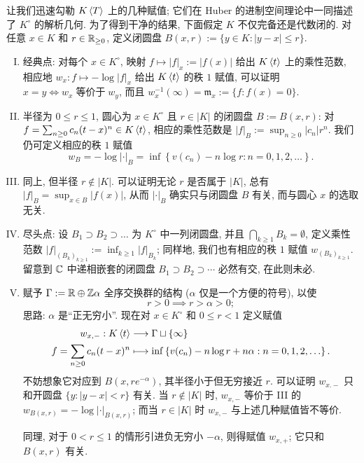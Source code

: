 让我们迅速勾勒 $K\left\langle T \right\rangle$ 上的几种赋值; 它们在 Huber 的进制空间理论中一同描述了 $K^\circ$ 的解析几何. 为了得到干净的结果, 下面假定 $K$ 不仅完备还是代数闭的. 对任意 $x \in K$ 和 $r \in \mathbb{R}_{\geq 0}$, 定义闭圆盘 $B(x,r) := \{ y \in K: |y-x| \leq r \}$.

\begin{enumerate}[I.]
	\item 经典点: 对每个 $x \in K^\circ$, 映射 $f \mapsto |f|_x := |f(x)|$ 给出 $K\left\langle t \right\rangle$ 上的乘性范数, 相应地 $w_x: f \mapsto -\log|f|_x$ 给出 $K\left\langle t \right\rangle$ 的秩 $1$ 赋值, 可以证明 $x=y \iff w_x \;\text{等价于}\; w_y$, 而且 $w_x^{-1}(\infty) = \mathfrak{m}_x := \{f: f(x)=0\}$.
	\item 半径为 $0 \leq r \leq 1$, 圆心为 $x \in K^\circ$ 且 $r \in |K|$ 的闭圆盘 $B := B(x,r)$: 对 $f = \sum_{n \geq 0} c_n (t-x)^n \in K\left\langle t \right\rangle$, 相应的乘性范数是 $|f|_B := \sup_{n \geq 0} |c_n| r^n$. 我们仍可定义相应的秩 $1$ 赋值
		\[ w_B = -\log|\cdot|_B = \inf\left\{ v(c_n) - n \log r : n=0,1,2,\ldots \right\}. \]
	\item 同上, 但半径 $r \notin |K|$. 可以证明无论 $r$ 是否属于 $|K|$, 总有 $|f|_B = \sup_{x \in B} |f(x)|$, 从而 $|\cdot|_B$ 确实只与闭圆盘 $B$ 有关, 而与圆心 $x$ 的选取无关. 
	\item 尽头点: 设 $B_1 \supset B_2 \supset \ldots$ 为 $K^\circ$ 中一列闭圆盘, 并且 $\bigcap_{k \geq 1} B_k = \emptyset$, 定义乘性范数 $|f|_{(B_k)_{k \geq 1}} := \inf_{k \geq 1} |f|_{B_k}$; 同样地, 我们也有相应的秩 $1$ 赋值 $w_{(B_k)_{k \geq 1}}$. 留意到 $\mathbb{C}$ 中递相嵌套的闭圆盘 $B_1 \supset B_2 \supset \cdots$ 必然有交, 在此则未必.
	\item 赋予 $\Gamma := \mathbb{R} \oplus \mathbb{Z}\alpha$ 全序交换群的结构 ($\alpha$ 仅是一个方便的符号), 以使
		\[ r > 0 \implies r > \alpha > 0; \]
		思路: $\alpha$ 是``正无穷小''. 现在对 $x \in K^\circ$ 和 $0 \leq r < 1$ 定义赋值
		\begin{align*}
			w_{x,-}: K\left\langle t \right\rangle & \longrightarrow \Gamma \sqcup\{\infty\} \\
			f = \sum_{n \geq 0} c_n (t-x)^n & \longmapsto \inf\left\{ v(c_n) - n \log r + n\alpha : n=0,1,2, \ldots \right\}.
		\end{align*}
		不妨想象它对应到 $B(x, re^{-\alpha})$, 其半径小于但无穷接近 $r$. 可以证明 $w_{x.-}$ 只和开圆盘 $\{y: |y-x| < r\}$ 有关. 当 $r \notin |K|$ 时, $w_{x,-}$ 等价于 III 的 $w_{B(x,r)} = -\log|\cdot|_{B(x,r)}$; 而当 $r \in |K|$ 时 $w_{x,-}$ 与上述几种赋值皆不等价.
		
		同理, 对于 $0 < r \leq 1$ 的情形引进负无穷小 $-\alpha$, 则得赋值 $w_{x,+}$; 它只和 $B(x,r)$ 有关.
\end{enumerate}

